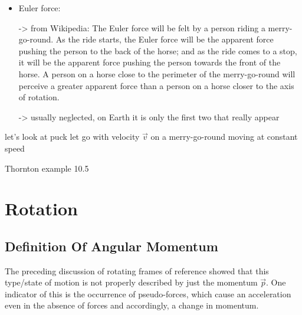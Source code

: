 \documentclass[../class_mech_main.tex]{subfiles}
\begin{document}
\begin{itemize}
    \item Euler force: 
    
    -> from Wikipedia: The Euler force will be felt by a person riding a merry-go-round. As the ride starts, the Euler force will be the apparent force pushing the person to the back of the horse; and as the ride comes to a stop, it will be the apparent force pushing the person towards the front of the horse. A person on a horse close to the perimeter of the merry-go-round will perceive a greater apparent force than a person on a horse closer to the axis of rotation. 
    
    -> usually neglected, on Earth it is only the first two that really appear
\end{itemize}



\begin{ex}

	let's look at puck let go with velocity $\vec{v}$ on a merry-go-round moving at constant speed
\end{ex}



\begin{ex}
	Thornton example 10.5
\end{ex}



	\section{Rotation}
% 
% 
			\subsection{Definition Of Angular Momentum}
The preceding discussion of rotating frames of reference showed that this type/state of motion is not properly described by just the momentum $\vec{p}$. One indicator of this is the occurrence of pseudo-forces, which cause an acceleration even in the absence of forces and accordingly, a change in momentum.
\end{document}
